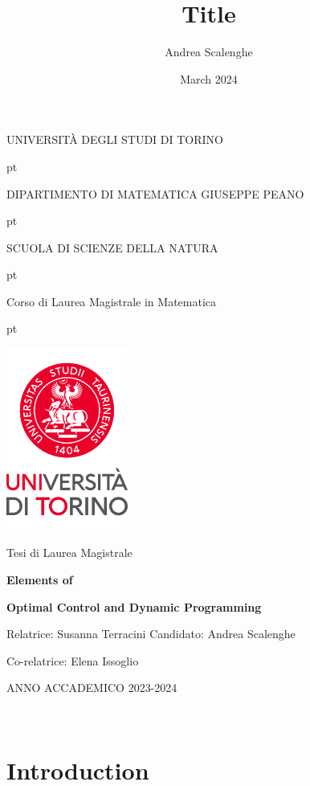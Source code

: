 \documentclass[12pt,a4paper]{book}
\title{Title}
\author{Andrea Scalenghe}
\date{March 2024}
\numberwithin{theorem}{section}
\numberwithin{definition}{section}
\numberwithin{example}{section}
\numberwithin{exercise}{section}
\begin{document}
\thispagestyle{empty}

\centerline {\Large{\textsc{ UNIVERSIT\`A DEGLI STUDI DI TORINO}}}
 pt

\centerline {\Large{\textsc DIPARTIMENTO DI MATEMATICA GIUSEPPE PEANO}}

 pt

\centerline {{\textsc SCUOLA DI SCIENZE DELLA NATURA}}

 pt

\centerline {\Large{\textsc Corso di Laurea Magistrale in Matematica}}
 pt





\centerline {\includegraphics[width=4cm]{logo_new_2022.png}}

\vskip 1.2cm

\centerline {\normalsize {Tesi di Laurea  Magistrale}} 

\vskip 0.7cm

\centerline {\Large {\bf Elements of} }
\vskip 0.3cm
\centerline {\Large {\bf Optimal Control and Dynamic Programming}}

\vskip 1.7cm

\noindent Relatrice: Susanna Terracini
\hfill  {Candidato: Andrea Scalenghe}

\noindent Co-relatrice: Elena Issoglio


\vskip 2.7cm


\centerline{ANNO ACCADEMICO 2023-2024}


\newpage

\ 

\newpage

\section*{Introduction}
\end{document}
